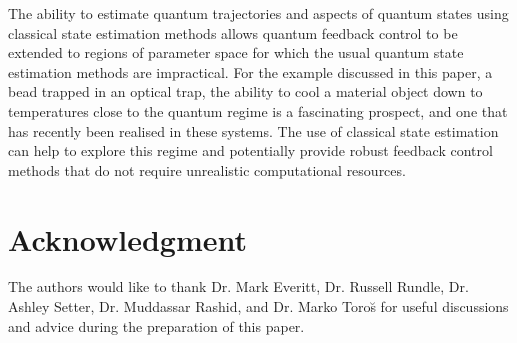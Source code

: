 \documentclass[conference]{IEEEtran}
\begin{document}
The ability to estimate quantum trajectories and aspects of quantum states using classical state estimation methods allows quantum feedback control to be extended to regions of parameter space for which the usual quantum state estimation methods are impractical. For the example discussed in this paper, a bead trapped in an optical trap, the ability to cool a material object down to temperatures close to the quantum regime is a fascinating prospect, and one that has recently been realised in these systems. The use of classical state estimation can help to explore this regime and potentially provide robust feedback control methods that do not require unrealistic computational resources. 


\section*{Acknowledgment}
The authors would like to thank Dr. Mark Everitt, Dr. Russell Rundle, Dr. Ashley Setter, Dr. Muddassar Rashid, and Dr. Marko Toro\u{s} for useful discussions and advice during the preparation of this paper.


\end{document}
